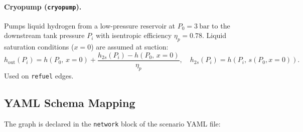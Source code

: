 \paragraph{Cryopump (\texttt{cryopump}).}
Pumps liquid hydrogen from a low-pressure reservoir at $P_0 = \SI{3}{\bar}$
to the downstream tank pressure $P_i$ with isentropic efficiency
$\eta_p = 0.78$.  Liquid saturation conditions ($x = 0$) are assumed at
suction:
\begin{equation}
  h_\text{out}(P_i)
  = h(P_0,\,x{=}0)
    + \frac{h_{2s}(P_i) - h(P_0,\,x{=}0)}{\eta_p},\quad
  h_{2s}(P_i) = h\!\left(P_i,\, s(P_0,x{=}0)\right).
  \label{eq:cryopump}
\end{equation}
Used on \texttt{refuel} edges.

\subsection{YAML Schema Mapping}
\label{sec:network:yaml}

The graph is declared in the \texttt{network} block of the scenario YAML file:

